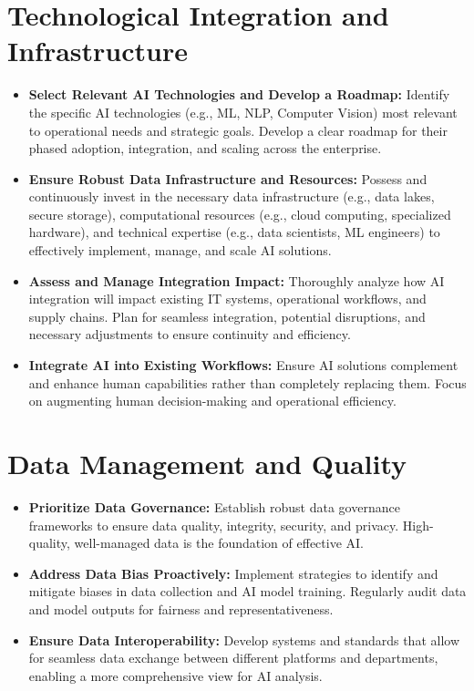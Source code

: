 \section*{Technological Integration and Infrastructure}
\begin{itemize}
    \item \textbf{Select Relevant AI Technologies and Develop a Roadmap:} Identify the specific AI technologies (e.g., ML, NLP, Computer Vision) most relevant to operational needs and strategic goals. Develop a clear roadmap for their phased adoption, integration, and scaling across the enterprise.
    \item \textbf{Ensure Robust Data Infrastructure and Resources:} Possess and continuously invest in the necessary data infrastructure (e.g., data lakes, secure storage), computational resources (e.g., cloud computing, specialized hardware), and technical expertise (e.g., data scientists, ML engineers) to effectively implement, manage, and scale AI solutions.
    \item \textbf{Assess and Manage Integration Impact:} Thoroughly analyze how AI integration will impact existing IT systems, operational workflows, and supply chains. Plan for seamless integration, potential disruptions, and necessary adjustments to ensure continuity and efficiency.
    \item \textbf{Integrate AI into Existing Workflows:} Ensure AI solutions complement and enhance human capabilities rather than completely replacing them. Focus on augmenting human decision-making and operational efficiency.
\end{itemize}

\section*{Data Management and Quality}
\begin{itemize}
    \item \textbf{Prioritize Data Governance:} Establish robust data governance frameworks to ensure data quality, integrity, security, and privacy. High-quality, well-managed data is the foundation of effective AI.
    \item \textbf{Address Data Bias Proactively:} Implement strategies to identify and mitigate biases in data collection and AI model training. Regularly audit data and model outputs for fairness and representativeness.
    \item \textbf{Ensure Data Interoperability:} Develop systems and standards that allow for seamless data exchange between different platforms and departments, enabling a more comprehensive view for AI analysis.
\end{itemize}

